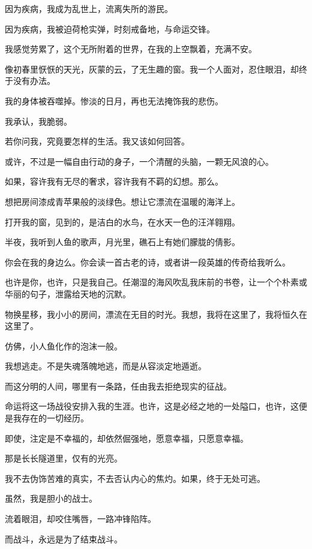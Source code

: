 \documentclass[12pt,a4paper]{article}
\def\blankrev{\vspace{1ex}}									%
\begin{document}
		\blankrev
		因为疾病，我成为乱世上，流离失所的游民。\par
		因为疾病，我被迫荷枪实弹，时刻戒备地，与命运交锋。\par
		我感觉劳累了，这个无所附着的世界，在我的上空飘着，充满不安。\par
		像初春里恹恹的天光，灰蒙的云，了无生趣的窗。我一个人面对，忍住眼泪，却终于没有办法。\par
		我的身体被吞噬掉。惨淡的日月，再也无法掩饰我的悲伤。\par
		我承认，我脆弱。

		\blankrev
		若你问我，究竟要怎样的生活。我又该如何回答。\par
		或许，不过是一幅自由行动的身子，一个清醒的头脑，一颗无风浪的心。\par
		如果，容许我有无尽的奢求，容许我有不羁的幻想。那么。\par
		想把房间漆成青苹果般的淡绿色。想让它漂流在温暖的海洋上。\par
		打开我的窗，见到的，是洁白的水鸟，在水天一色的汪洋翱翔。\par
		半夜，我听到人鱼的歌声，月光里，礁石上有她们朦胧的倩影。\par
		你会在我的身边么。你会读一首古老的诗，或者讲一段英雄的传奇给我听么。\par
		也许是你，也许，只是我自己。任潮湿的海风吹乱我床前的书卷，让一个个朴素或华丽的句子，泄露给天地的沉默。\par
		物换星移，我小小的房间，漂流在无目的时光。我想，我将在这里了，我将恒久在这里了。\par
		仿佛，小人鱼化作的泡沫一般。

		\blankrev
		我想逃走。不是失魂落魄地逃，而是从容淡定地遁逝。\par
		而这分明的人间，哪里有一条路，任由我去拒绝现实的征战。\par
		命运将这一场战役安排入我的生涯。也许，这是必经之地的一处隘口，也许，这便是我存在的一切经历。\par
		即使，注定是不幸福的，却依然倔强地，愿意幸福，只愿意幸福。\par
		那是长长隧道里，仅有的光亮。\par
		我不去伪饰苦难的真实，不去否认内心的焦灼。如果，终于无处可逃。\par
		虽然，我是胆小的战士。\par
		流着眼泪，却咬住嘴唇，一路冲锋陷阵。

		\blankrev
		而战斗，永远是为了结束战斗。

	\endwriting
\end{document}
